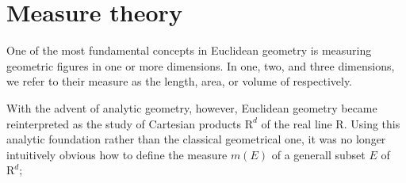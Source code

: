 \chapter{Measure theory}

One of the most fundamental concepts in Euclidean geometry is measuring 
geometric figures in one or more dimensions. In one, two, and three dimensions, 
we refer to their measure as the length, area, or volume of respectively.

With the advent of analytic geometry, however, Euclidean geometry became 
reinterpreted as the study of Cartesian products $\mathrm{R}^d$ of the real line 
$\mathrm{R}$. Using this analytic foundation rather than the classical geometrical 
one, it was no longer intuitively obvious how to define the measure $m(E)$ of a 
generall subset $E$ of $\mathrm{R}^d$;

